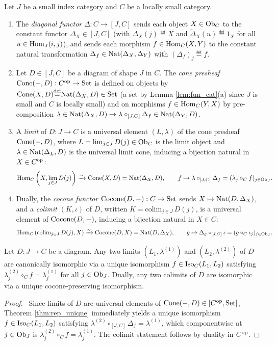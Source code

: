 \documentclass[10pt,a4paper]{article}
\renewcommand{\myprf}{\begin{proof}}
\renewcommand{\myqed}{\end{proof}}
\begin{document}
\begin{definition}\label{def:limits}
Let $J$ be a small index category and $C$ be a locally small category.
\begin{enumerate}
\item The \emph{diagonal functor} $\Delta : C \to [J, C]$ sends each object $X \in {\textrm{Ob}}_C$ to the constant functor $\Delta_X \in [J, C]$ (with $\Delta_X(j) \eqdef X$ and $\widetilde{\Delta}_X(u) \eqdef 1_X$ for all $u \in {\textrm{Hom}}_J(i, j)$), and sends each morphism $f \in {\textrm{Hom}}_C(X, Y)$ to the constant natural transformation $\Delta_f \in {\textrm{Nat}}(\Delta_X, \Delta_Y)$ with $(\Delta_f)_j \eqdef f$.
\item Let $D \in [J, C]$ be a diagram of shape $J$ in $C$. The \emph{cone presheaf} ${\mathrm{Cone}}(-, D) : C^{\textrm{op}} \to {\textrm{Set}}$ is defined on objects by ${\mathrm{Cone}}(X, D) {\stackrel{{\textrm{def}}}{=}} {\textrm{Nat}}(\Delta_X, D) \in {\textrm{Set}}$ (a set by Lemma \ref{lem:fun_cat}(a) since $J$ is small and $C$ is locally small) and on morphisms $f \in {\textrm{Hom}}_C(Y, X)$ by pre-composition $\lambda \in {\textrm{Nat}}(\Delta_X, D) \mapsto \lambda \circ_{[J,C]} \Delta_f \in {\textrm{Nat}}(\Delta_Y, D)$.
\item A \emph{limit} of $D : J \to C$ is a universal element $(L, \lambda)$ of the cone presheaf ${\mathrm{Cone}}(-, D)$, where $L = \lim_{j \in J} D(j) \in {\textrm{Ob}}_C$ is the limit object and $\lambda \in {\textrm{Nat}}(\Delta_L, D)$ is the universal limit cone, inducing a bijection natural in $X \in C^{\textrm{op}}$:
$${\textrm{Hom}}_C\left(X, \lim_{j \in J} D(j)\right) \xrightarrow{\sim} {\mathrm{Cone}}(X, D) = {\textrm{Nat}}(\Delta_X, D), \qquad f \mapsto \lambda \circ_{[J,C]} \Delta_f = (\lambda_j \circ_C f)_{j \in {\textrm{Ob}}_J}.$$
\item Dually, the \emph{cocone functor} ${\mathrm{Cocone}}(D, -) : C \to {\textrm{Set}}$ sends $X \mapsto {\textrm{Nat}}(D, \Delta_X)$, and a \emph{colimit} $(K, \iota)$ of $D$, written $K = \mathrm{colim}_{j \in J}\, D(j)$, is a universal element of ${\mathrm{Cocone}}(D, -)$, inducing a bijection natural in $X \in C$:
$${\textrm{Hom}}_C\left(\mathrm{colim}_{j \in J}\, D(j), X\right) \xrightarrow{\sim} {\mathrm{Cocone}}(D, X) = {\textrm{Nat}}(D, \Delta_X), \qquad g \mapsto \Delta_g \circ_{[J,C]} \iota = (g \circ_C \iota_j)_{j \in {\textrm{Ob}}_J}.$$
\end{enumerate}
\end{definition}

\begin{theorem}\label{thm:limit_unique}
Let $D : J \to C$ be a diagram. Any two limits $(L_1, \lambda^{(1)})$ and $(L_2, \lambda^{(2)})$ of $D$ are canonically isomorphic via a unique isomorphism $f \in {\mathrm{Iso}}_C(L_1, L_2)$ satisfying $\lambda^{(2)}_j \circ_C f = \lambda^{(1)}_j$ for all $j \in {\textrm{Ob}}_J$. Dually, any two colimits of $D$ are isomorphic via a unique cocone-preserving isomorphism.
\end{theorem}
\myprf\ Since limits of $D$ are universal elements of ${\mathrm{Cone}}(-, D) \in [C^{\textrm{op}}, {\textrm{Set}}]$, Theorem \ref{thm:rep_unique} immediately yields a unique isomorphism $f \in {\mathrm{Iso}}_C(L_1, L_2)$ satisfying $\lambda^{(2)} \circ_{[J,C]} \Delta_f = \lambda^{(1)}$, which componentwise at $j \in {\textrm{Ob}}_J$ is $\lambda^{(2)}_j \circ_C f = \lambda^{(1)}_j$. The colimit statement follows by duality in $C^{\textrm{op}}$. \myqed
\end{document}
